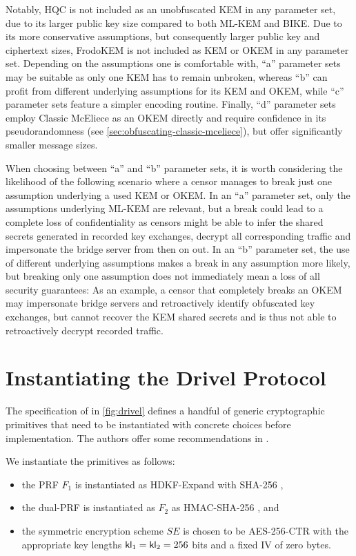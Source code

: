 Notably, HQC is not included as an unobfuscated KEM in any parameter set, due to its larger public key size compared to both ML-KEM and BIKE. Due to its more conservative assumptions, but consequently larger public key and ciphertext sizes, FrodoKEM is not included as KEM or OKEM in any parameter set. Depending on the assumptions one is comfortable with, ``a'' parameter sets may be suitable as only one KEM has to remain unbroken, whereas ``b'' can profit from different underlying assumptions for its KEM and OKEM, while ``c'' parameter sets feature a simpler encoding routine. Finally, ``d'' parameter sets employ Classic McEliece as an OKEM directly and require confidence in its pseudorandomness (see \cref{sec:obfuscating-classic-mceliece}), but offer significantly smaller message sizes.

When choosing between ``a'' and ``b'' parameter sets, it is worth considering the likelihood of the following scenario where a censor manages to break just one assumption underlying a used KEM or OKEM.
In an ``a'' parameter set, only the assumptions underlying ML-KEM are relevant, but a break could lead to a complete loss of confidentiality as censors might be able to infer the shared secrets generated in recorded key exchanges, decrypt all corresponding traffic and impersonate the bridge server from then on out.
In an ``b'' parameter set, the use of different underlying assumptions makes a break in any assumption more likely, but breaking only one assumption does not immediately mean a loss of all security guarantees: As an example, a censor that completely breaks an OKEM may impersonate bridge servers and retroactively identify obfuscated key exchanges, but cannot recover the KEM shared secrets and is thus not able to retroactively decrypt recorded traffic.

\section{Instantiating the Drivel Protocol} \label{sec:drivel-instance}

The specification of \drivel{} in \cref{fig:drivel} defines a handful of generic cryptographic primitives that need to be instantiated with concrete choices before implementation.
The authors offer some recommendations in \cite[Section~4.2]{EPRINT:GRSV25}.

We instantiate the primitives as follows:
\begin{itemize}
    \item the PRF $F_1$ is instantiated as \textsf{HDKF-Expand} with \textsf{SHA-256} \cite{C:Krawczyk10,rfc5869},
    
    \item the dual-PRF is instantiated as $F_2$ as \textsf{HMAC-SHA-256} \cite{C:BelCanKra96,KraBelCan97}, and
    
    \item the symmetric encryption scheme $SE$ is chosen to be \textsf{AES-256-CTR} with the appropriate key lengths $\mathsf{kl}_1 = \mathsf{kl}_2 = 256$ bits and a fixed IV of zero bytes.
\end{itemize}

